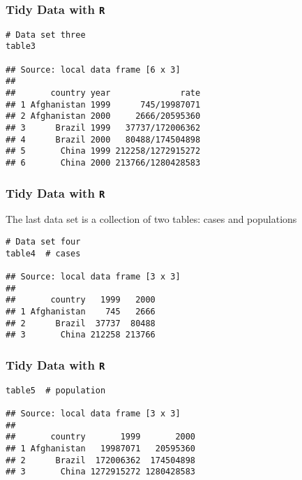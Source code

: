 \documentclass[TIDYMASTER.tex]{subfiles}
\begin{document}
\begin{frame}[fragile]
	\frametitle{Tidy Data with \texttt{R}}
	\large
	\begin{framed}
		\begin{verbatim}
# Data set three
table3

## Source: local data frame [6 x 3]
## 
##       country year              rate
## 1 Afghanistan 1999      745/19987071
## 2 Afghanistan 2000     2666/20595360
## 3      Brazil 1999   37737/172006362
## 4      Brazil 2000   80488/174504898
## 5       China 1999 212258/1272915272
## 6       China 2000 213766/1280428583
\end{verbatim}
\end{framed}
\end{frame}
\begin{frame}[fragile]
	\frametitle{Tidy Data with \texttt{R}}
	\large
The last data set is a collection of two tables: cases and populations
	\begin{framed}
		\begin{verbatim}
# Data set four
table4  # cases

## Source: local data frame [3 x 3]
## 
##       country   1999   2000
## 1 Afghanistan    745   2666
## 2      Brazil  37737  80488
## 3       China 212258 213766
\end{verbatim}
\end{framed}
\end{frame}
\begin{frame}[fragile]
	\frametitle{Tidy Data with \texttt{R}}
	\large
	\begin{framed}
		\begin{verbatim}
table5  # population

## Source: local data frame [3 x 3]
## 
##       country       1999       2000
## 1 Afghanistan   19987071   20595360
## 2      Brazil  172006362  174504898
## 3       China 1272915272 1280428583
\end{verbatim}
\end{framed}
\end{frame}
%
\end{document}

